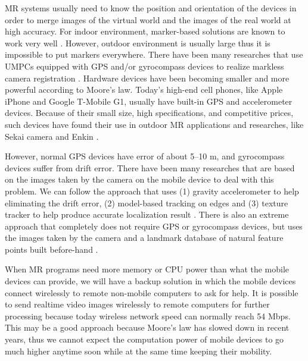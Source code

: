 MR systems usually need to know the position and orientation of the devices in order to merge images of the virtual world and the images of the real world at high accuracy. For indoor environment, marker-based solutions are known to work very well \cite{Reference20}. However, outdoor environment is usually large thus it is impossible to put markers everywhere. There have been many researches that use UMPCs equipped with GPS and/or gyrocompass devices to realize markless camera registration \cite{Reference2} \cite{Reference4} \cite{Reference13}. Hardware devices have been becoming smaller and more powerful according to Moore's law. Today's high-end cell phones, like Apple iPhone and Google T-Mobile G1, usually have built-in GPS and accelerometer devices. Because of their small size, high specifications, and competitive prices, such devices have found their use in outdoor MR applications and researches, like Sekai camera \cite{Reference18} and Enkin \cite{Reference19}.

However, normal GPS devices have error of about 5--10 m, and gyrocompass devices suffer from drift error. There have been many researches that are based on the images taken by the camera on the mobile device to deal with this problem. We can follow the approach that uses (1) gravity accelerometer to help eliminating the drift error, (2) model-based tracking on edges and (3) texture tracker to help produce accurate localization result \cite{Reference13}. There is also an extreme approach that completely does not require GPS or gyrocompass devices, but uses the images taken by the camera and a landmark database of natural feature points built before-hand \cite{Reference21}.

When MR programs need more memory or CPU power than what the mobile devices can provide, we will have a backup solution in which the mobile devices connect wirelessly to remote non-mobile computers to ask for help. It is possible to send realtime video images wirelessly to remote computers for further processing because today wireless network speed can normally reach 54 Mbps. This may be a good approach because Moore's law has slowed down in recent years, thus we cannot expect the computation power of mobile devices to go much higher anytime soon while at the same time keeping their mobility.
